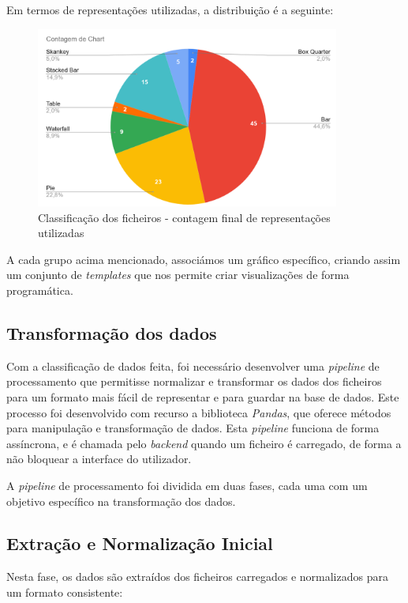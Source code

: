 Em termos de representações utilizadas, a distribuição é a seguinte:
\begin{figure}[h]
    \centering
    \includegraphics[max width=10cm]{./img/stats2}
 \caption{Classificação dos ficheiros - contagem final de representações utilizadas}
 \end{figure}


A cada grupo acima mencionado, associámos um gráfico específico, criando assim um conjunto de \textit{templates} que nos permite criar visualizações de forma programática.

\subsection{Transformação dos dados}

Com a classificação de dados feita, foi necessário desenvolver uma \textit{pipeline} de processamento que permitisse normalizar e transformar os dados dos ficheiros para um formato mais fácil de representar e para guardar na base de dados. Este processo foi desenvolvido com recurso a biblioteca \textit{Pandas}, que oferece métodos para manipulação e transformação de dados. Esta \textit{pipeline} funciona de forma assíncrona, e é chamada pelo \textit{backend} quando um ficheiro é carregado, de forma a não bloquear a interface do utilizador.

A \textit{pipeline} de processamento foi dividida em duas fases, cada uma com um objetivo específico na transformação dos dados.

\subsection{Extração e Normalização Inicial}

Nesta fase, os dados são extraídos dos ficheiros carregados e normalizados para um formato consistente:

